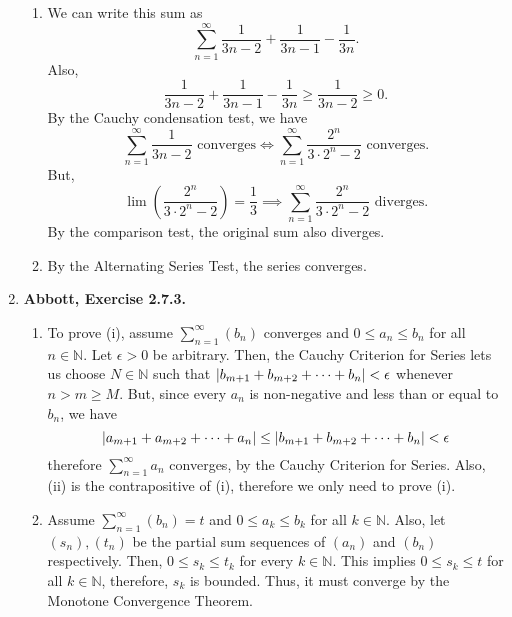 \documentclass{article}
\DeclarePairedDelimiter\abs{\lvert}{\rvert}
\newcommand{\N}{\mathbb{N}}
\newcommand{\exc}[2][Abbott]{\item \textbf{#1, Exercise #2.}}
\newcommand{\lep}[1][L]{#1et $\epsilon > 0$ be arbitrary}
\begin{document}
\begin{enumerate}
\begin{enumerate}
        \item We can write this sum as 
        \begin{equation*}
            \sum_{n=1}^\infty \frac{1}{3n-2}+\frac{1}{3n-1}-\frac{1}{3n}.
        \end{equation*} Also, 
        \begin{equation*}
             \frac{1}{3n-2}+\frac{1}{3n-1}-\frac{1}{3n} \geq \frac{1}{3n-2} \geq 0.
        \end{equation*} By the Cauchy condensation test, we have
        \begin{equation*}
            \sum_{n=1}^\infty \frac{1}{3n-2} \text{ converges} \iff 
            \sum_{n=1}^\infty \frac{2^n}{3\cdot2^n-2} \text{ converges.}
        \end{equation*} But, 
        \begin{equation*}
            \lim\left({\frac{2^n}{3\cdot2^n-2}}\right) = \frac{1}{3} \implies 
            \sum_{n=1}^\infty \frac{2^n}{3\cdot2^n-2} \text{ diverges.}
        \end{equation*} By the comparison test, the original sum also diverges.
        
        \item By the Alternating Series Test, the series converges.
    \end{enumerate}
    
    \exc{2.7.3}
    \begin{enumerate}
        \item To prove (i), assume $\sum_{n=1}^\infty (b_n)$ converges and $0 \leq a_n \leq b_n$ for all $n \in \N$. \lep. Then, the Cauchy Criterion for Series lets us choose $N \in \N$ such that $\abs*{b_{m+1}+b_{m+2} + \dots + b_{n}} < \epsilon$ whenever $n > m \geq M$. But, since every $a_n$ is non-negative and less than or equal to $b_n$, we have 
        \begin{equation*}
           \abs*{a_{m+1}+a_{m+2} + \dots + a_{n}} \leq \abs*{b_{m+1}+b_{m+2} + \dots + b_{n}} < \epsilon
        \end{equation*} therefore $\sum_{n=1}^\infty a_n$ converges, by the Cauchy Criterion for Series. Also, (ii) is the contrapositive of (i), therefore we only need to prove (i).
        
        \item Assume $\sum_{n=1}^\infty (b_n) = t$ and $0 \leq a_k \leq b_k$ for all $k \in \N$. Also, let $(s_n), (t_n)$ be the partial sum sequences of $(a_n)$ and $(b_n)$ respectively. Then, $0 \leq s_k \leq t_k$ for every $k \in \N$. This implies $0 \leq s_k \leq t$ for all $k \in \N$, therefore, $s_k$ is bounded. Thus, it must converge by the Monotone Convergence Theorem.
    \end{enumerate}
    

\end{enumerate}
\end{document}
